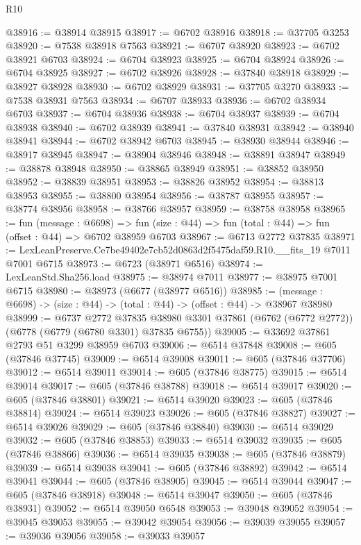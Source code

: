 \begin{lexlean}{R10}
\begin{coremodule}
@38916 := @38914 @38915
@38917 := @6702 @38916
@38918 := @37705 @3253
@38920 := @7538 @38918 @7563
@38921 := @6707 @38920
@38923 := @6702 @38921 @6703
@38924 := @6704 @38923
@38925 := @6704 @38924
@38926 := @6704 @38925
@38927 := @6702 @38926
@38928 := @37840 @38918
@38929 := @38927 @38928
@38930 := @6702 @38929
@38931 := @37705 @3270
@38933 := @7538 @38931 @7563
@38934 := @6707 @38933
@38936 := @6702 @38934 @6703
@38937 := @6704 @38936
@38938 := @6704 @38937
@38939 := @6704 @38938
@38940 := @6702 @38939
@38941 := @37840 @38931
@38942 := @38940 @38941
@38944 := @6702 @38942 @6703
@38945 := @38930 @38944
@38946 := @38917 @38945
@38947 := @38904 @38946
@38948 := @38891 @38947
@38949 := @38878 @38948
@38950 := @38865 @38949
@38951 := @38852 @38950
@38952 := @38839 @38951
@38953 := @38826 @38952
@38954 := @38813 @38953
@38955 := @38800 @38954
@38956 := @38787 @38955
@38957 := @38774 @38956
@38958 := @38766 @38957
@38959 := @38758 @38958
@38965 := fun (message : @6698) =>
  fun (size : @44) => fun (total : @44) => fun (offset : @44) => @6702 @38959 @6703
@38967 := @6713 @2772 @37835
@38971 := LexLeanPreserve.Ce7be49402e7cb52d0863d2f5475daf59.R10.__fits_19 @7011 @7001 @6715
@38973 := @6723 (@38971 @6516)
@38974 := LexLeanStd.Sha256.load
@38975 := @38974 @7011
@38977 := @38975 @7001 @6715
@38980 := @38973 (@6677 (@38977 @6516))
@38985 := (message : @6698) -> (size : @44) -> (total : @44) -> (offset : @44) -> @38967 @38980
@38999 := @6737
    @2772
    @37835
    @38980
    @3301
    @37861
    (@6762 (@6772 @2772))
    (@6778 (@6779 (@6780 @3301) @37835 @6755))
@39005 := @33692 @37861 @2793 @51 @3299 @38959 @6703
@39006 := @6514 @37848
@39008 := @605 (@37846 @37745)
@39009 := @6514 @39008
@39011 := @605 (@37846 @37706)
@39012 := @6514 @39011
@39014 := @605 (@37846 @38775)
@39015 := @6514 @39014
@39017 := @605 (@37846 @38788)
@39018 := @6514 @39017
@39020 := @605 (@37846 @38801)
@39021 := @6514 @39020
@39023 := @605 (@37846 @38814)
@39024 := @6514 @39023
@39026 := @605 (@37846 @38827)
@39027 := @6514 @39026
@39029 := @605 (@37846 @38840)
@39030 := @6514 @39029
@39032 := @605 (@37846 @38853)
@39033 := @6514 @39032
@39035 := @605 (@37846 @38866)
@39036 := @6514 @39035
@39038 := @605 (@37846 @38879)
@39039 := @6514 @39038
@39041 := @605 (@37846 @38892)
@39042 := @6514 @39041
@39044 := @605 (@37846 @38905)
@39045 := @6514 @39044
@39047 := @605 (@37846 @38918)
@39048 := @6514 @39047
@39050 := @605 (@37846 @38931)
@39052 := @6514 @39050 @6548
@39053 := @39048 @39052
@39054 := @39045 @39053
@39055 := @39042 @39054
@39056 := @39039 @39055
@39057 := @39036 @39056
@39058 := @39033 @39057

\end{coremodule}
\end{lexlean}
